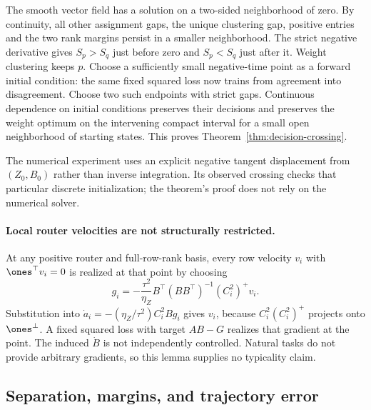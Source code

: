 The smooth vector field has a solution on a two-sided neighborhood of
zero. By continuity, all other assignment gaps, the unique clustering
gap, positive entries and the two rank margins persist in a smaller
neighborhood. The strict negative derivative gives $S_p>S_q$ just
before zero and $S_p<S_q$ just after it. Weight clustering keeps $p$.
Choose a sufficiently small negative-time point as a forward initial
condition: the same fixed squared loss now trains from agreement into
disagreement. Choose two such endpoints with strict gaps. Continuous
dependence on initial conditions preserves their decisions and preserves
the weight optimum on the intervening compact interval for a small open
neighborhood of starting states. This proves Theorem~\ref{thm:decision-crossing}.

The numerical experiment uses an explicit negative tangent displacement
from $(Z_0,B_0)$ rather than inverse integration. Its observed crossing
checks that particular discrete initialization; the theorem's proof does
not rely on the numerical solver.

\paragraph{Local router velocities are not structurally restricted.}
At any positive router and full-row-rank basis, every row velocity $v_i$
with $\ones^\top v_i=0$ is realized at that point by choosing
\[
 g_i=-\frac{\tau^2}{\eta_Z}
 B^\top(BB^\top)^{-1}(C_i^2)^+v_i.
\]
Substitution into $\dot a_i=-(\eta_Z/\tau^2)C_i^2Bg_i$ gives $v_i$,
because $C_i^2(C_i^2)^+$ projects onto $\ones^\perp$. A fixed squared
loss with target $AB-G$ realizes that gradient at the point. The induced
$\dot B$ is not independently controlled. Natural tasks do not provide
arbitrary gradients, so this lemma supplies no typicality claim.

\subsection{Separation, margins, and trajectory error}
\label{app:decision-stability}

